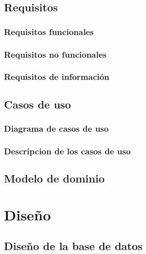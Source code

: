 \documentclass[openright,twoside,10pt]{book}
\begin{document}
    \subsection{Requisitos}\label{requisitos}
    
    \subsubsection{Requisitos funcionales}\label{requisitos-funcionales}
    
    \subsubsection{Requisitos no
    funcionales}\label{requisitos-no-funcionales}
    
    \subsubsection{Requisitos de
    información}\label{requisitos-de-informaciuxf3n}
    
    \subsection{Casos de uso}\label{casos-de-uso}
    
    \subsubsection{Diagrama de casos de uso}\label{diagrama-de-casos-de-uso}
    
    \subsubsection{Descripcion de los casos de
    uso}\label{descripcion-de-los-casos-de-uso}
    
    \subsection{Modelo de dominio}\label{modelo-de-dominio}
    
    \section{Diseño}\label{diseuxf1o}
    
    \subsection{Diseño de la base de
    datos}\label{diseuxf1o-de-la-base-de-datos}
    
\end{document}
